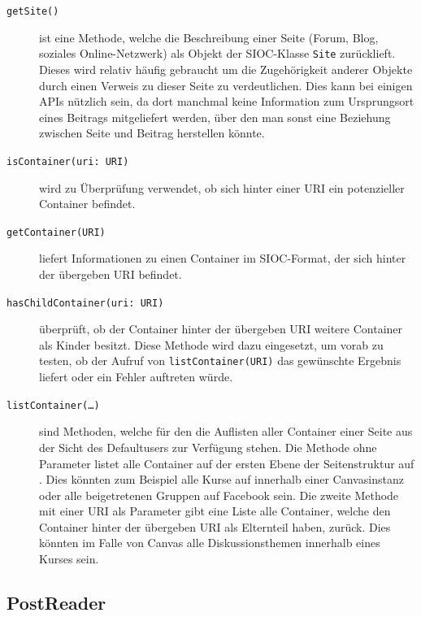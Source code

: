 \begin{description}
    \item[\texttt{getSite()}] ist eine Methode, welche die Beschreibung einer Seite (Forum, Blog, soziales Online-Netzwerk) als Objekt der SIOC-Klasse \texttt{Site} zurücklieft. Dieses wird relativ häufig gebraucht um die Zugehörigkeit anderer Objekte durch einen Verweis zu dieser Seite zu verdeutlichen. Dies kann bei einigen APIs nützlich sein, da dort manchmal keine Information zum Ursprungsort eines Beitrags mitgeliefert werden, über den man sonst eine Beziehung zwischen Seite und Beitrag herstellen könnte.

    \item[\texttt{isContainer(uri: URI)}] wird zu Überprüfung verwendet, ob sich hinter einer URI ein potenzieller Container befindet. 

    \item[\texttt{getContainer(URI)}] liefert Informationen zu einen Container im SIOC-Format, der sich hinter der übergeben URI befindet.

    \item[\texttt{hasChildContainer(uri: URI)}] überprüft, ob der Container hinter der übergeben URI weitere Container als Kinder besitzt. Diese Methode wird dazu eingesetzt, um vorab zu testen, ob der Aufruf von \texttt{listContainer(URI)} das gewünschte Ergebnis liefert oder ein Fehler auftreten würde. 

    \item[\texttt{listContainer(\dots)}] sind Methoden, welche für den die Auflisten aller Container einer Seite aus der Sicht des Defaultusers zur Verfügung stehen. Die Methode ohne Parameter listet alle Container auf der ersten Ebene der Seitenstruktur auf . Dies könnten zum Beispiel alle Kurse auf innerhalb einer Canvasinstanz oder alle beigetretenen Gruppen auf Facebook sein. Die zweite Methode mit einer URI als Parameter gibt eine Liste alle Container, welche den Container hinter der übergeben URI als Elternteil haben, zurück. Dies könnten im Falle von Canvas alle Diskussionsthemen innerhalb eines Kurses sein.
\end{description}


\subsection{PostReader} %
\label{sub:postreader}

